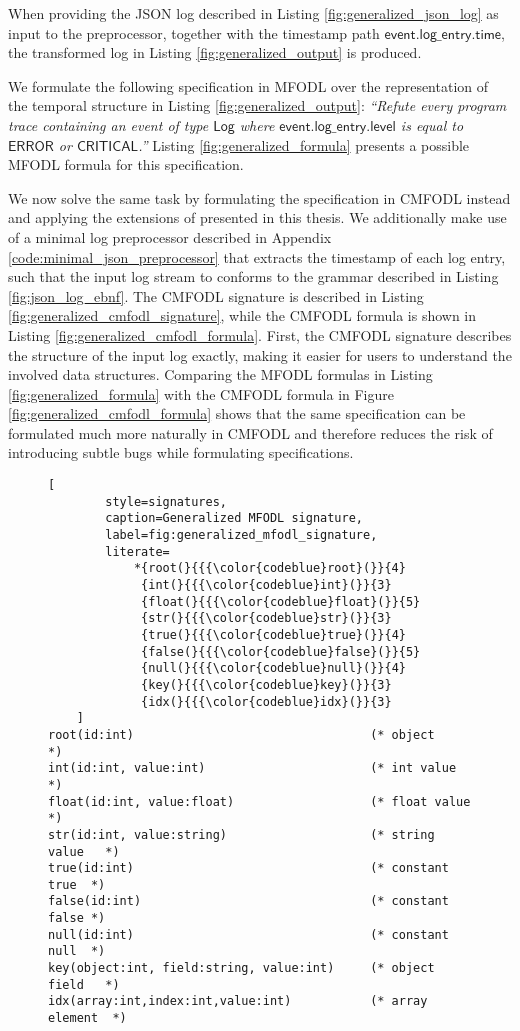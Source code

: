 When providing the JSON log described in Listing \ref{fig:generalized_json_log} as input to the preprocessor, together with the timestamp path $\mathsf{event.log\_entry.time}$, the transformed log in Listing \ref{fig:generalized_output} is produced.

We formulate the following specification in MFODL over the representation of the temporal structure in Listing \ref{fig:generalized_output}: \textit{\enquote{Refute every program trace containing an event of type $\mathsf{Log}$ where $\mathsf{event.log\_entry.level}$ is equal to $\mathsf{ERROR}$ or $\mathsf{CRITICAL}$.}} Listing \ref{fig:generalized_formula} presents a possible MFODL formula for this specification.

We now solve the same task by formulating the specification in CMFODL instead and applying the extensions of \MonPoly presented in this thesis. We additionally make use of a minimal log preprocessor described in Appendix \ref{code:minimal_json_preprocessor} that extracts the timestamp of each log entry, such that the input log stream to \MonPoly conforms to the grammar described in Listing \ref{fig:json_log_ebnf}. The CMFODL signature is described in Listing \ref{fig:generalized_cmfodl_signature}, while the CMFODL formula is shown in Listing \ref{fig:generalized_cmfodl_formula}. First, the CMFODL signature describes the structure of the input log exactly, making it easier for users to understand the involved data structures. Comparing the MFODL formulas in Listing \ref{fig:generalized_formula} with the CMFODL formula in Figure \ref{fig:generalized_cmfodl_formula} shows that the same specification can be formulated much more naturally in CMFODL and therefore reduces the risk of introducing subtle bugs while formulating specifications.

\begin{figure}[p]
	\begin{lstlisting}[
		style=signatures,
		caption=Generalized MFODL signature,
		label=fig:generalized_mfodl_signature,
		literate=
			*{root(}{{{\color{codeblue}root}(}}{4}
			 {int(}{{{\color{codeblue}int}(}}{3}
			 {float(}{{{\color{codeblue}float}(}}{5}
			 {str(}{{{\color{codeblue}str}(}}{3}
			 {true(}{{{\color{codeblue}true}(}}{4}
			 {false(}{{{\color{codeblue}false}(}}{5}
			 {null(}{{{\color{codeblue}null}(}}{4}
			 {key(}{{{\color{codeblue}key}(}}{3}
			 {idx(}{{{\color{codeblue}idx}(}}{3}
	]
root(id:int)                                 (* object         *)
int(id:int, value:int)                       (* int value      *)
float(id:int, value:float)                   (* float value    *)
str(id:int, value:string)                    (* string value   *)
true(id:int)                                 (* constant true  *)
false(id:int)                                (* constant false *)
null(id:int)                                 (* constant null  *)
key(object:int, field:string, value:int)     (* object field   *)
idx(array:int,index:int,value:int)           (* array element  *)\end{lstlisting}
\end{figure}

